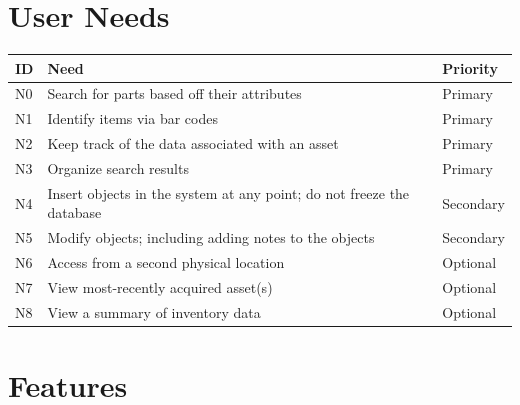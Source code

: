 \documentclass{article}
\begin{document}
\section{User Needs}
\begin{tabular}{ | p{0.15in} | p{4.0in} | p{.75in} |}
\hline
\textbf{ID} & \textbf{Need} & \textbf{Priority} \\
\hline
\hline
N0 & Search for parts based off their attributes & Primary \\
\hline
N1 & Identify items via bar codes & Primary \\
\hline
N2 & Keep track of the data associated with an asset & Primary \\
\hline
N3 & Organize search results & Primary \\
\hline
N4 & Insert objects in the system at any point; do not freeze the database & Secondary \\
\hline
N5 & Modify objects; including adding notes to the objects & Secondary \\
\hline
N6 & Access from a second physical location & Optional \\
\hline
N7 & View most-recently acquired asset(s) & Optional \\
\hline
N8 & View a summary of inventory data & Optional \\
\hline
\end{tabular}

\section{Features}
\end{document}
